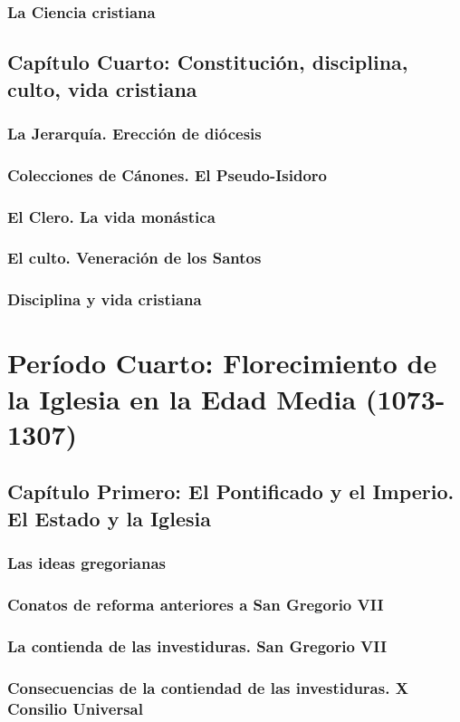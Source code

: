 \raggedbottom{} \documentclass[12pt, a4paper]{book}
\begin{document}
\section{La Ciencia cristiana}
\chapter{Capítulo Cuarto: Constitución, disciplina, culto, vida cristiana}
\section{La Jerarquía. Erección de diócesis}
\section{Colecciones de Cánones. El Pseudo-Isidoro}
\section{El Clero. La vida monástica}
\section{El culto. Veneración de los Santos}
\section{Disciplina y vida cristiana}
\part{Período Cuarto: Florecimiento de la Iglesia en la Edad Media (1073-1307)}
\chapter{Capítulo Primero: El Pontificado y el Imperio. El Estado y la Iglesia}
\section{Las ideas gregorianas}
\section{Conatos de reforma anteriores a San Gregorio VII}
\section{La contienda de las investiduras. San Gregorio VII}
\section{Consecuencias de la contiendad de las investiduras. X Consilio Universal}
\end{document}
